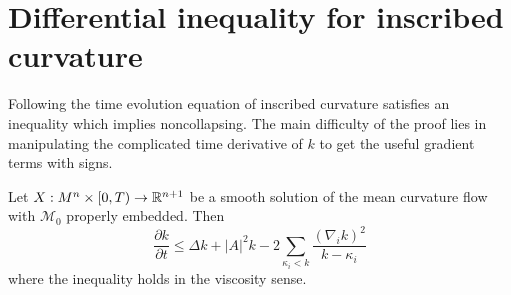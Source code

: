 \section{Differential inequality for inscribed curvature}

Following \cite{andrews2022extrinsic,brendle2015sharp} the time evolution equation of inscribed curvature satisfies an inequality which implies noncollapsing. The main difficulty of the proof lies in manipulating the complicated time derivative of $ k $ to get the useful gradient terms with signs. 

\begin{thm}\label{gradnoncollapsing}
    Let $ X : M^{n} \times [0,T) \to \mathbb{R}^{n+1} $ be a smooth solution of the mean curvature flow with $ \mathcal{M}_{0} $ properly embedded. Then \begin{equation}
        \frac{\partial k}{ \partial t} \le \Delta k + |A|^{2}k -2 \sum_{\kappa_{i}<k} \frac{(\nabla_{i}k)^{2}}{k- \kappa_{i}} \label{gradientnoncollapsing}
    \end{equation}
    where the inequality holds in the viscosity sense. 
\end{thm}
\begin{comment}
    Before that we will show that  
\begin{lemma}
    The inscribed curvature satisfies 
    \[ k(x) \ge \lim_{y \to x} \sup k(x,y) = \kappa_{n}(x) \]
    where $ \kappa_{1} \le \ldots \le \kappa_{n} $ denotes the principal curvatures of $ \mathcal{M} $. 
\end{lemma}
\end{comment}
